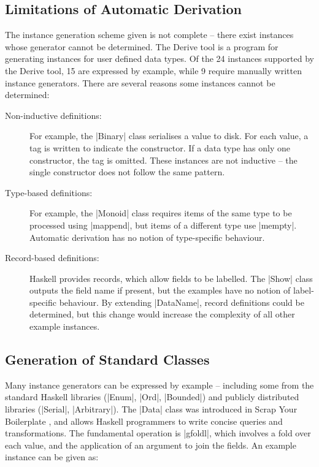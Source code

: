 \documentclass[preprint]{sigplanconf}
\begin{document}
\begin{code}
\subsection{Limitations of Automatic Derivation}
\label{sec:automatic_failure}

The instance generation scheme given is not complete -- there exist instances whose generator cannot be determined. The Derive tool \cite{derive} is a program for generating instances for user defined data types. Of the 24 instances supported by the Derive tool, 15 are expressed by example, while 9 require manually written instance generators. There are several reasons some instances cannot be determined:

\begin{description}

\item[Non-inductive definitions:] For example, the |Binary| class serialises a value to disk. For each value, a tag is written to indicate the constructor. If a data type has only one constructor, the tag is omitted. These instances are not inductive -- the single constructor does not follow the same pattern.

\item[Type-based definitions:] For example, the |Monoid| class requires items of the same type to be processed using |mappend|, but items of a different type use |mempty|. Automatic derivation has no notion of type-specific behaviour.

\item [Record-based definitions:] Haskell provides records, which allow fields to be labelled. The |Show| class outputs the field name if present, but the examples have no notion of label-specific behaviour. By extending |DataName|, record definitions could be determined, but this change would increase the complexity of all other example instances.

\end{description}

\subsection{Generation of Standard Classes}
\label{sec:automatic_success}

Many instance generators can be expressed by example -- including some from the standard Haskell libraries (|Enum|, |Ord|, |Bounded|) and publicly distributed libraries (|Serial|, |Arbitrary|). The |Data| class was introduced in Scrap Your Boilerplate \cite{lammel:syb}, and allows Haskell programmers to write concise queries and transformations. The fundamental operation is |gfoldl|, which involves a fold over each value, and the application of an argument to join the fields. An example instance can be given as:


\end{code}
\end{document}
